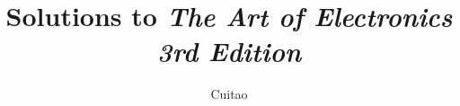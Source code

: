 \documentclass{book}
\author{Cuitao}
\begin{document}
\title{Solutions to \textit{The Art of Electronics 3rd Edition}}
\maketitle
\setcounter{tocdepth}{1} %
\tableofcontents

\end{document}
